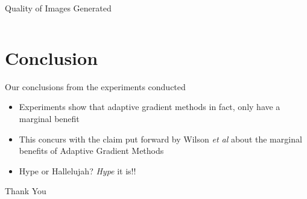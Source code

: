 \documentclass[10pt]{beamer}
\begin{document}
\begin{frame}{Quality of Images Generated}
\begin{columns}
\end{columns}
\end{frame}

\section{Conclusion}
\begin{frame}{Our conclusions from the experiments conducted}
\begin{itemize}
\item<1->{Experiments show that adaptive gradient methods in fact, only have a marginal benefit}
\item<2->{This concurs with the claim put forward by Wilson \textit{et al} about the marginal benefits of Adaptive Gradient Methods}
\item<3->{Hype or Hallelujah? \emph{Hype} it is!!}
\end{itemize}
\end{frame}

\begin{frame}
\Huge{Thank You}
\end{frame}
\end{document}

